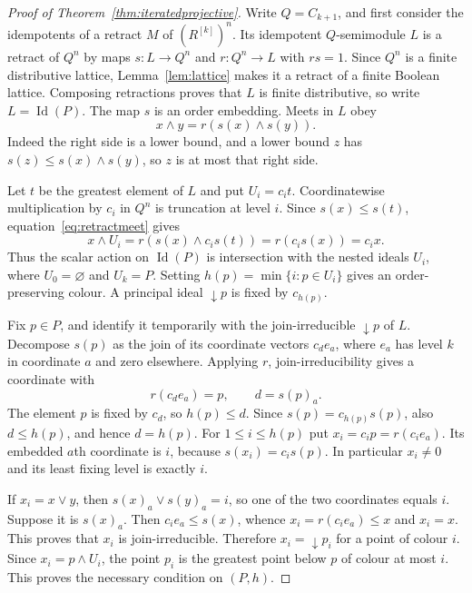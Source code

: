 \documentclass[11pt]{amsart}
\DeclareMathOperator{\Id}{Id}
\theoremstyle{definition}
\theoremstyle{remark}
\begin{document}
\begin{proof}[Proof of Theorem~\ref{thm:iteratedprojective}]
Write $Q=C_{k+1}$, and first consider the idempotents of a retract $M$ of $(R^{[k]})^n$. Its idempotent $Q$-semimodule $L$ is a retract of $Q^n$ by maps $s:L\to Q^n$ and $r:Q^n\to L$ with $rs=1$. Since $Q^n$ is a finite distributive lattice, Lemma~\ref{lem:lattice} makes it a retract of a finite Boolean lattice. Composing retractions proves that $L$ is finite distributive, so write $L=\Id(P)$. The map $s$ is an order embedding. Meets in $L$ obey
\begin{equation}\label{eq:retractmeet}
 x\wedge y=r(s(x)\wedge s(y)).
\end{equation}
Indeed the right side is a lower bound, and a lower bound $z$ has $s(z)\le s(x)\wedge s(y)$, so $z$ is at most that right side.

Let $t$ be the greatest element of $L$ and put $U_i=c_it$. Coordinatewise multiplication by $c_i$ in $Q^n$ is truncation at level $i$. Since $s(x)\le s(t)$, equation~\eqref{eq:retractmeet} gives
\[
 x\wedge U_i=r(s(x)\wedge c_i s(t))=r(c_i s(x))=c_i x.
\]
Thus the scalar action on $\Id(P)$ is intersection with the nested ideals $U_i$, where $U_0=\varnothing$ and $U_k=P$. Setting $h(p)=\min\{i:p\in U_i\}$ gives an order-preserving colour. A principal ideal $\downarrow p$ is fixed by $c_{h(p)}$.

Fix $p\in P$, and identify it temporarily with the join-irreducible $\downarrow p$ of $L$. Decompose $s(p)$ as the join of its coordinate vectors $c_d e_a$, where $e_a$ has level $k$ in coordinate $a$ and zero elsewhere. Applying $r$, join-irreducibility gives a coordinate with
\[
 r(c_d e_a)=p,\qquad d=s(p)_a.
\]
The element $p$ is fixed by $c_d$, so $h(p)\le d$. Since $s(p)=c_{h(p)}s(p)$, also $d\le h(p)$, and hence $d=h(p)$. For $1\le i\le h(p)$ put $x_i=c_ip=r(c_ie_a)$. Its embedded $a$th coordinate is $i$, because $s(x_i)=c_i s(p)$. In particular $x_i\ne0$ and its least fixing level is exactly $i$.

If $x_i=x\vee y$, then $s(x)_a\vee s(y)_a=i$, so one of the two coordinates equals $i$. Suppose it is $s(x)_a$. Then $c_ie_a\le s(x)$, whence $x_i=r(c_ie_a)\le x$ and $x_i=x$. This proves that $x_i$ is join-irreducible. Therefore $x_i=\downarrow p_i$ for a point of colour $i$. Since $x_i=p\wedge U_i$, the point $p_i$ is the greatest point below $p$ of colour at most $i$. This proves the necessary condition on $(P,h)$.


\end{proof}
\end{document}
